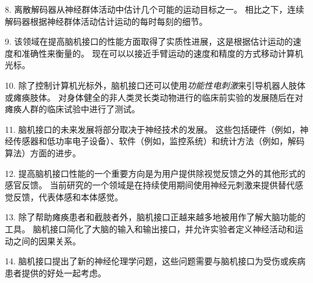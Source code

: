 8. 离散解码器从神经群体活动中估计几个可能的运动目标之一。
相比之下，连续解码器根据神经群体活动估计运动的每时每刻的细节。


9. 该领域在提高脑机接口的性能方面取得了实质性进展，这是根据估计运动的速度和准确性来衡量的。
现在可以以接近手臂运动的速度和精度的方式移动计算机光标。


10. 除了控制计算机光标外，脑机接口还可以使用\textit{功能性电刺激}来引导机器人肢体或瘫痪肢体。
对身体健全的非人类灵长类动物进行的临床前实验的发展随后在对瘫痪人群的临床试验中进行了测试。


11. 脑机接口的未来发展将部分取决于神经技术的发展。
这些包括硬件（例如，神经传感器和低功率电子设备）、软件（例如，监控系统）和统计方法（例如，解码算法）方面的进步。


12. 提高脑机接口性能的一个重要方向是为用户提供除视觉反馈之外的其他形式的感官反馈。
当前研究的一个领域是在持续使用期间使用神经元刺激来提供替代感觉反馈，代表体感和本体感觉。


13. 除了帮助瘫痪患者和截肢者外，脑机接口正越来越多地被用作了解大脑功能的工具。
脑机接口简化了大脑的输入和输出接口，并允许实验者定义神经活动和运动之间的因果关系。


14. 脑机接口提出了新的神经伦理学问题，这些问题需要与脑机接口为受伤或疾病患者提供的好处一起考虑。

